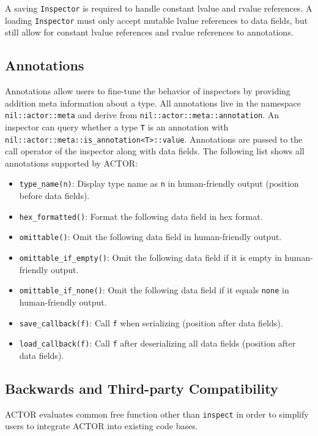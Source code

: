 A saving \lstinline^Inspector^ is required to handle constant lvalue and rvalue
references. A loading \lstinline^Inspector^ must only accept mutable lvalue
references to data fields, but still allow for constant lvalue references and
rvalue references to annotations.

\subsection{Annotations}

Annotations allow users to fine-tune the behavior of inspectors by providing
addition meta information about a type. All annotations live in the namespace
\lstinline^nil::actor::meta^ and derive from \lstinline^nil::actor::meta::annotation^. An
inspector can query whether a type \lstinline^T^ is an annotation with
\lstinline^nil::actor::meta::is_annotation<T>::value^. Annotations are passed to the
call operator of the inspector along with data fields. The following list shows
all annotations supported by ACTOR:

\begin{itemize}
\item \lstinline^type_name(n)^: Display type name as \lstinline^n^ in
  human-friendly output (position before data fields).
\item \lstinline^hex_formatted()^: Format the following data field in hex
  format.
\item \lstinline^omittable()^: Omit the following data field in human-friendly
  output.
\item \lstinline^omittable_if_empty()^: Omit the following data field if it is
  empty in human-friendly output.
\item \lstinline^omittable_if_none()^: Omit the following data field if it
  equals \lstinline^none^ in human-friendly output.
\item \lstinline^save_callback(f)^: Call \lstinline^f^ when serializing
  (position after data fields).
\item \lstinline^load_callback(f)^: Call \lstinline^f^ after deserializing all
  data fields (position after data fields).
\end{itemize}

\subsection{Backwards and Third-party Compatibility}

ACTOR evaluates common free function other than \lstinline^inspect^ in order to
simplify users to integrate ACTOR into existing code bases.

